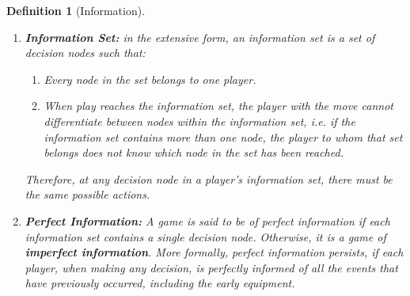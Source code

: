 \documentclass[12pt]{extreport} %
\theoremstyle{named}
\theoremstyle{itshape}
\newtheorem*{definition}{Definition}
\theoremstyle{normal}
\begin{document}
\begin{definition}[Information] ~\
	\begin{enumerate}
		\item \textbf{Information Set:} in the extensive form, an information set is a set of decision nodes such that:
			\begin{enumerate}
				\item Every node in the set belongs to one player.
			 	\item When play reaches the information set, the player with the move cannot differentiate between nodes within the information set, i.e. if the information set contains more than one node, the player to whom that set belongs does not know which node in the set has been reached.
			\end{enumerate}
			Therefore, at any decision node in a player's information set, there must be the same possible actions.
		\item \textbf{Perfect Information:} A game is said to be of perfect information if each information set contains a single decision node. Otherwise, it is a game of \textbf{imperfect information}. More formally, perfect information persists, if each player, when making any decision, is perfectly informed of all the events that have previously occurred, including the early equipment.
	\end{enumerate}
\end{definition} 
\end{document}
